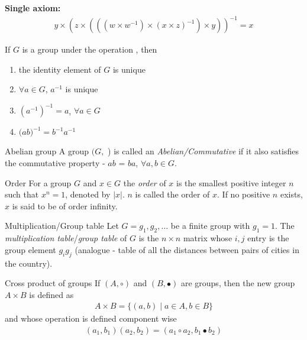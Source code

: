 \documentclass[titlepage, 12pt]{book}
\begin{document}
\textbf{Single axiom:}
\begin{gather*}
y \times (z \times (((w \times w^{-1}) \times (x \times z)^{-1}) \times y))^{-1} = x
\end{gather*}

If $G$ is a group under the operation , then
\begin{enumerate}
    \item the identity element of $G$ is unique
    \item $\forall a\in G$, $a^{-1}$ is unique
    \item $(a^{-1})^{-1} = a$, $\forall a\in G$
    \item $(a$$b)^{-1} = b^{-1}$$a^{-1}$
\end{enumerate}

\begin{definition}{Abelian group}{}
    A group $(G,$ ) is called an \textit{Abelian/Commutative} if
    it also satisfies the commutative property - $a$$b$ =
    $b$$a$, $\forall a, b\in G$.
\end{definition}

\begin{definition}{Order}{}
    For a group $G$ and $x\in G$ the \textit{order} of $x$ is the smallest
    positive integer $n$ such that $x^n = 1$, denoted by $|x|$. $n$ is
    called the order of $x$. If no positive $n$ exists, $x$ is said to be of
    order infinity.
\end{definition}

\begin{definition}{Multiplication/Group table}{}
  Let $G = {g_1, g_2,\ldots}$ be a finite group with $g_1 = 1$. The
    \textit{multiplication table}/\textit{group table} of $G$ is the
    $n\times n$ matrix whose $i, j$ entry is the group element $g_ig_j$
    (analogue - table of all the distances between pairs of cities in the
    country).
\end{definition}

\begin{definition}{Cross product of groups}{}
  If $(A, \circ)$ and $(B, \bullet)$ are groups, then the new group $A\times B$ is defined as
    \begin{gather*}
      A\times B = \{(a, b)\mid a\in A, b\in B\}
    \end{gather*}
    and whose operation is defined component wise
    \begin{gather*}
      (a_1, b_1)(a_2, b_2) = (a_1\circ a_2, b_1\bullet b_2)
    \end{gather*}
\end{definition}
\end{document}
